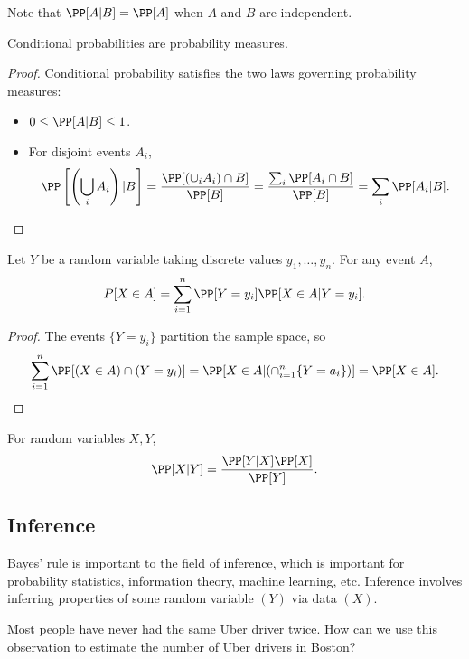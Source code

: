 Note that $\PP[A|B] = \PP[A]$ when $A$ and $B$ are independent. 

\begin{theorem}
\lemlabel

Conditional probabilities are probability measures. 
\end{theorem}

\begin{proof}
Conditional probability satisfies the two laws governing probability measures:
\begin{itemize}
    \item $0\leq \PP[A|B]\leq 1$. 
    \item For disjoint events $A_i$, 
    \[\PP\left[\left(\bigcup_i A_i\right)\vert B\right] = \frac{\PP[(\cup_i A_i)\cap B]}{\PP[B]} = \frac{\sum_i \PP[A_i\cap B]}{\PP[B]} = \sum_i \PP[A_i\vert B]. \]
\end{itemize}
\end{proof}

\begin{theorem}

Let $Y$ be a random variable taking discrete values $y_1, \hdots, y_n$. For any event $A$, 
\[P[X\in A] = \sum_{i=1}^n\PP[Y=y_i]\PP[X\in A|Y=y_i].\]
\end{theorem}

\begin{proof}
The events $\{Y=y_i\}$ partition the sample space, so 
\[\sum_{i=1}^n\PP[(X\in A)\cap (Y=y_i)] = \PP[X\in A|(\cap_{i=1}^n\{Y=a_i\})] = \PP[X\in A].\]
\end{proof}

\begin{theorem}

For random variables $X,Y$, 
\[\PP[X\vert Y] = \frac{\PP[Y\vert X]\PP[X]}{\PP[Y]}.\]
\end{theorem}

\subsection{Inference}

Bayes' rule is important to the field of \ac{inference}, which is important for probability statistics, information theory, machine learning, etc. Inference involves inferring properties of some random variable $(Y)$ via data $(X)$. 

\begin{example}
\exlabel

Most people have never had the same Uber driver twice. How can we use this observation to estimate the number of Uber drivers in Boston?
\end{example}

